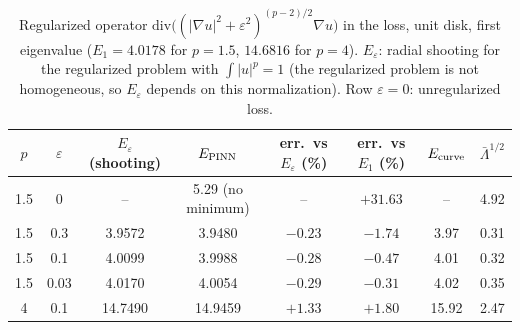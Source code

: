 \begin{table}[ht]
\centering
\begin{tabular}{cccccccc}
\toprule
$p$ & $\varepsilon$ & $E_\varepsilon$ (shooting) & $E_{\rm PINN}$ & err.\ vs $E_\varepsilon$ (\%) & err.\ vs $E_1$ (\%) & $E_{\rm curve}$ & $\bar\Lambda^{1/2}$ \\
\midrule
1.5 & 0 & -- & 5.29 (no minimum) & -- & $+31.63$ & -- & 4.92 \\
1.5 & 0.3 & 3.9572 & 3.9480 & $-0.23$ & $-1.74$ & 3.97 & 0.31 \\
1.5 & 0.1 & 4.0099 & 3.9988 & $-0.28$ & $-0.47$ & 4.01 & 0.32 \\
1.5 & 0.03 & 4.0170 & 4.0054 & $-0.29$ & $-0.31$ & 4.02 & 0.35 \\
4 & 0.1 & 14.7490 & 14.9459 & $+1.33$ & $+1.80$ & 15.92 & 2.47 \\
\bottomrule
\end{tabular}
\caption{Regularized operator $\mathrm{div}\big((|\nabla u|^2+\varepsilon^2)^{(p-2)/2}\nabla u\big)$ in the loss, unit disk, first eigenvalue ($E_1=4.0178$ for $p=1.5$, $14.6816$ for $p=4$). $E_\varepsilon$: radial shooting for the regularized problem with $\int|u|^p=1$ (the regularized problem is not homogeneous, so $E_\varepsilon$ depends on this normalization). Row $\varepsilon=0$: unregularized loss.}
\label{tab.plap.reg}
\end{table}

